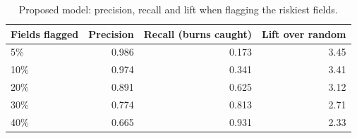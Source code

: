 \begin{table}[t]
\centering
\caption{Proposed model: precision, recall and lift when flagging the riskiest fields.}
\label{tab:table4_topk}
\begin{tabular}{lrrr}
\hline
Fields flagged & Precision & Recall (burns caught) & Lift over random \\
\hline
5\% & 0.986 & 0.173 & 3.45 \\
10\% & 0.974 & 0.341 & 3.41 \\
20\% & 0.891 & 0.625 & 3.12 \\
30\% & 0.774 & 0.813 & 2.71 \\
40\% & 0.665 & 0.931 & 2.33 \\
\hline
\end{tabular}
\end{table}
